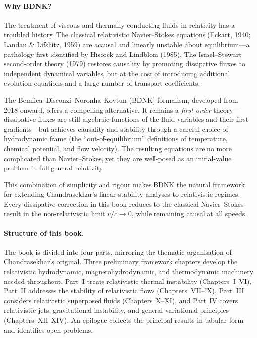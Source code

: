 \documentclass[12pt]{book}
\begin{document}
\paragraph{Why BDNK?}
The treatment of viscous and thermally conducting fluids in relativity has a
troubled history.  The classical relativistic Navier--Stokes equations
(Eckart, 1940; Landau \& Lifshitz, 1959) are acausal and linearly unstable
about equilibrium---a pathology first identified by Hiscock and Lindblom
(1985).  The Israel--Stewart second-order theory (1979) restores causality by
promoting dissipative fluxes to independent dynamical variables, but at the
cost of introducing additional evolution equations and a large number of
transport coefficients.

The Bemfica--Disconzi--Noronha--Kovtun (BDNK) formalism, developed from 2018
onward, offers a compelling alternative.  It remains a \emph{first-order}
theory---dissipative fluxes are still algebraic functions of the fluid
variables and their first gradients---but achieves causality and stability
through a careful choice of hydrodynamic frame (the ``out-of-equilibrium''
definitions of temperature, chemical potential, and flow velocity).  The
resulting equations are no more complicated than Navier--Stokes, yet they are
well-posed as an initial-value problem in full general relativity.

This combination of simplicity and rigour makes BDNK the natural framework for
extending Chandrasekhar's linear-stability analyses to relativistic regimes.
Every dissipative correction in this book reduces to the classical
Navier--Stokes result in the non-relativistic limit $v/c \to 0$, while
remaining causal at all speeds.

\paragraph{Structure of this book.}
The book is divided into four parts, mirroring the thematic organisation of
Chandrasekhar's original.  Three preliminary framework chapters develop the
relativistic hydrodynamic, magnetohydrodynamic, and thermodynamic machinery
needed throughout.  Part~I treats relativistic thermal instability
(Chapters~I--VI), Part~II addresses the stability of relativistic flows
(Chapters~VII--IX), Part~III considers relativistic superposed fluids
(Chapters~X--XI), and Part~IV covers relativistic jets, gravitational
instability, and general variational principles (Chapters~XII--XIV).  An
epilogue collects the principal results in tabular form and identifies open
problems.
\end{document}
